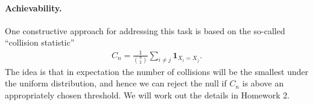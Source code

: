 \documentclass[12pt]{article}
\begin{document}
\paragraph{Achievability.} One constructive approach for addressing this task is based on the so-called ``collision statistic'' 
\begin{align}
C_n = \frac{1}{{n \choose 2}}\sum_{i \neq j} \boldsymbol{1}_{X_i = X_j}. 
\end{align}
The idea is that in expectation the number of collisions will be the smallest under the uniform distribution, and hence we can reject the null if $C_n$ is above an appropriately chosen threshold. We will work out the details in Homework 2. 


% 
\end{document}
